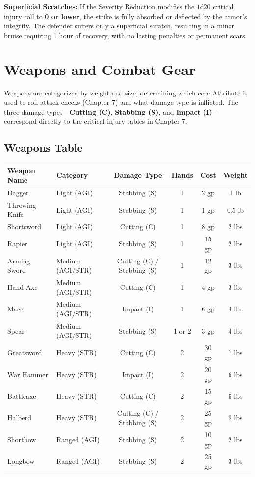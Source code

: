\textbf{Superficial Scratches:} If the Severity Reduction modifies the $1\text{d}20$ critical injury roll to \textbf{0 or lower}, the strike is fully absorbed or deflected by the armor's integrity. The defender suffers only a superficial scratch, resulting in a minor bruise requiring 1 hour of recovery, with no lasting penalties or permanent scars.

\section{Weapons and Combat Gear}

Weapons are categorized by weight and size, determining which core Attribute is used to roll attack checks (Chapter 7) and what damage type is inflicted. The three damage types—\textbf{Cutting (C)}, \textbf{Stabbing (S)}, and \textbf{Impact (I)}—correspond directly to the critical injury tables in Chapter 7.

\subsection{Weapons Table}

\begin{center}
\begin{tabular}{llcccc}
\hline
\textbf{Weapon Name} & \textbf{Category} & \textbf{Damage Type} & \textbf{Hands} & \textbf{Cost} & \textbf{Weight} \\ \hline
Dagger & Light (AGI) & Stabbing (S) & 1 & 2 gp & 1 lb \\
Throwing Knife & Light (AGI) & Stabbing (S) & 1 & 1 gp & 0.5 lb \\
Shortsword & Light (AGI) & Cutting (C) & 1 & 8 gp & 2 lbs \\
Rapier & Light (AGI) & Stabbing (S) & 1 & 15 gp & 2 lbs \\
Arming Sword & Medium (AGI/STR) & Cutting (C) / Stabbing (S) & 1 & 12 gp & 3 lbs \\
Hand Axe & Medium (AGI/STR) & Cutting (C) & 1 & 4 gp & 3 lbs \\
Mace & Medium (AGI/STR) & Impact (I) & 1 & 6 gp & 4 lbs \\
Spear & Medium (AGI/STR) & Stabbing (S) & 1 or 2 & 3 gp & 4 lbs \\
Greatsword & Heavy (STR) & Cutting (C) & 2 & 30 gp & 7 lbs \\
War Hammer & Heavy (STR) & Impact (I) & 2 & 20 gp & 6 lbs \\
Battleaxe & Heavy (STR) & Cutting (C) & 2 & 15 gp & 6 lbs \\
Halberd & Heavy (STR) & Cutting (C) / Stabbing (S) & 2 & 25 gp & 8 lbs \\
Shortbow & Ranged (AGI) & Stabbing (S) & 2 & 10 gp & 2 lbs \\
Longbow & Ranged (AGI) & Stabbing (S) & 2 & 25 gp & 3 lbs \\ \hline
\end{tabular}
\end{center}

